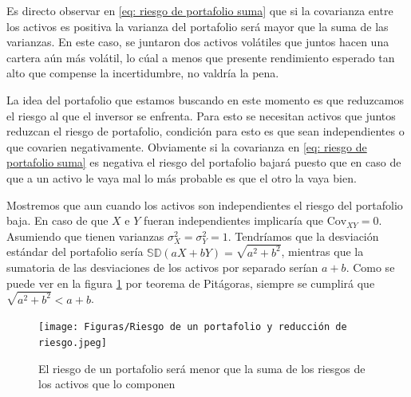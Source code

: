 Es directo observar en \ref{eq: riesgo de portafolio suma} que si la covarianza entre los activos es positiva la varianza del portafolio será mayor que la suma de las varianzas. En este caso, se juntaron dos activos volátiles que juntos hacen una cartera aún más volátil, lo cúal a menos que presente rendimiento esperado tan alto que compense la incertidumbre, no valdría la pena. 

La idea del portafolio que estamos buscando en este momento es que reduzcamos el riesgo al que el inversor se enfrenta. Para esto se necesitan activos que juntos reduzcan el riesgo de portafolio, condición para esto es que sean independientes o que covarien negativamente. Obviamente si la covarianza en \ref{eq: riesgo de portafolio suma} es negativa el riesgo del portafolio bajará puesto que en caso de que a un activo le vaya mal lo más probable es que el otro la vaya bien.

Mostremos que aun cuando los activos son independientes el riesgo del portafolio baja. En caso de que $X$ e $Y$ fueran independientes implicaría que $\text{Cov}_{XY}= 0$. Asumiendo que tienen varianzas $\sigma_X^2 = \sigma^2_Y = 1$. Tendríamos que la desviación estándar del portafolio sería $\mathbb{SD}(aX + bY) = \sqrt{a^2 + b^2}$, mientras que la sumatoria de las desviaciones de los activos por separado serían $a+b$. Como se puede ver en la figura \ref{fig: Diversificación del riesgo con dos activos} por teorema de Pitágoras, siempre se cumplirá que $\sqrt{a^2 + b^2} < a+b$.

\begin{figure}[ht]
    \centering
    \caption{El riesgo de un portafolio será menor que la suma de los riesgos de los activos que lo componen}
    \texttt{[image: Figuras/Riesgo de un portafolio y reducción de riesgo.jpeg]}
    \label{fig: Diversificación del riesgo con dos activos}
\end{figure}


